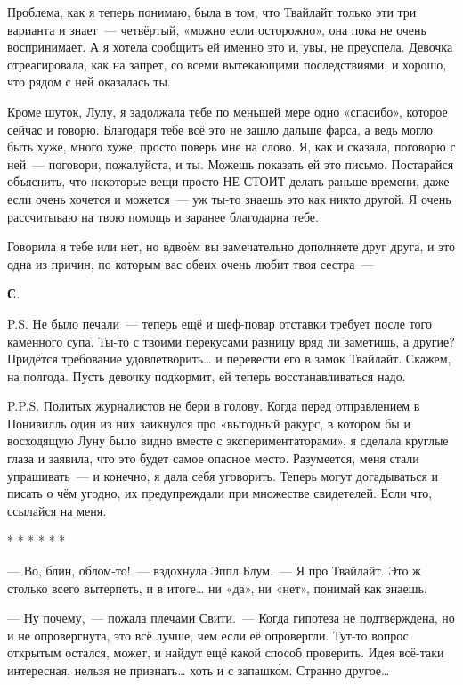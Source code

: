\documentclass[fontsize=11pt,a5paper,titlepage=firstcover]{scrbook}
\begin{document}
Проблема, как я теперь понимаю, была в том, что Твайлайт только эти три варианта и знает~--- четвёртый, «можно если осторожно», она пока не очень воспринимает. А я хотела сообщить ей именно это и, увы, не преуспела. Девочка отреагировала, как на запрет, со всеми вытекающими последствиями, и хорошо, что рядом с ней оказалась ты.

Кроме шуток, Лулу, я задолжала тебе по меньшей мере одно «спасибо», которое сейчас и говорю. Благодаря тебе всё это не зашло дальше фарса, а ведь могло быть хуже, много хуже, просто поверь мне на слово. Я, как и сказала, поговорю с ней~--- поговори, пожалуйста, и ты. Можешь показать ей это письмо. Постарайся объяснить, что некоторые вещи просто НЕ СТОИТ делать раньше времени, даже если очень хочется и можется~--- уж ты-то знаешь это как никто другой. Я очень рассчитываю на твою помощь и заранее благодарна тебе.

Говорила я тебе или нет, но вдвоём вы замечательно дополняете друг друга, и это одна из причин, по которым вас обеих очень любит твоя сестра~---
\begin{flushright}\textbf{С}.\end{flushright}
P.S. Не было печали~--- теперь ещё и шеф-повар отставки требует после того каменного супа. Ты-то с твоими перекусами разницу вряд ли заметишь, а другие? Придётся требование удовлетворить{\ldots} и перевести его в замок Твайлайт. Скажем, на полгода. Пусть девочку подкормит, ей теперь восстанавливаться надо.

P.P.S. Политых журналистов не бери в голову. Когда перед отправлением в Понивилль один из них заикнулся про «выгодный ракурс, в котором бы и восходящую Луну было видно вместе с экспериментаторами», я сделала круглые глаза и заявила, что это будет самое опасное место. Разумеется, меня стали упрашивать~--- и конечно, я дала себя уговорить. Теперь могут догадываться и писать о чём угодно, их предупреждали при множестве свидетелей. Если что, ссылайся на меня.
\begin{center}
	* * * * * *
\end{center}

--- Во, блин, облом-то!~--- вздохнула Эппл Блум.~--- Я про Твайлайт. Это ж столько всего вытерпеть, и в итоге{\ldots} ни «да», ни «нет», понимай как знаешь.

--- Ну почему,~--- пожала плечами Свити.~--- Когда гипотеза не подтверждена, но и не опровергнута, это всё лучше, чем если её опровергли. Тут-то вопрос открытым остался, может, и найдут ещё какой способ проверить. Идея всё-таки интересная, нельзя не признать{\ldots} хоть и с запашко́м. Странно другое{\ldots}
\end{document}
